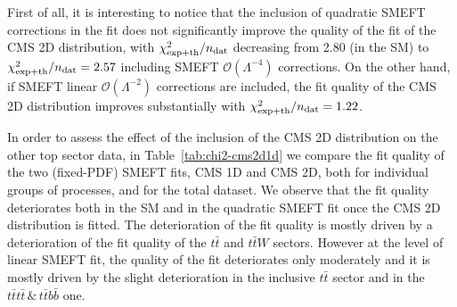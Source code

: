 \documentclass[withindex,glossary]{cam-thesis}
\begin{document}
 First of all, it is interesting to notice that the inclusion of
 quadratic SMEFT corrections in the fit does not significantly improve the
 quality of the fit of the CMS 2D distribution, with $\chi^2_{\rm exp+th}/n_{\rm
   dat}$ decreasing from 2.80 (in the SM) 
to $\chi^2_{\rm exp+th}/n_{\rm dat}=2.57$ including  SMEFT $\mathcal{O}(\Lambda^{-4})$ corrections.
 On the other hand, if SMEFT linear $\mathcal{O}(\Lambda^{-2})$ corrections are included, the fit quality of the CMS 2D distribution
 improves substantially with $\chi^2_{\rm exp+th}/n_{\rm dat}=1.22$. 

 In order to assess the effect of the inclusion of the CMS 2D distribution on the other top sector data,
 in Table~\ref{tab:chi2-cms2d1d} we compare the fit quality of the two (fixed-PDF) SMEFT fits, CMS 1D and CMS 2D,
 both for individual groups of processes, and for the total dataset.
 We observe that the fit quality deteriorates both in the SM and in
 the quadratic SMEFT fit once the CMS 2D distribution is fitted. The deterioration of the fit
 quality is mostly driven by a deterioration of the fit quality of the
 $t\bar{t}$ and $t\bar{t}W$ sectors. However at the level of linear
 SMEFT fit, the quality of the fit deteriorates only moderately and it
 is mostly driven by the slight deterioration in the inclusive
 $t\bar{t}$ sector and in the $t\bar{t}t\bar{t}\,\&\,
 t\bar{t}b\bar{b}$ one.
\end{document}
